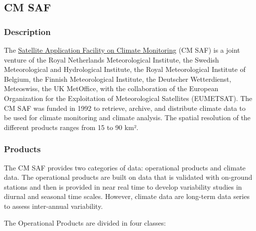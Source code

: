 \documentclass[11pt]{article}
\begin{document}
\subsection{CM SAF}
\label{sec-1-7}

\subsubsection{Description}
\label{sec-1-7-1}
The \href{http://www.cmsaf.eu/}{Satellite Application Facility on Climate Monitoring} (CM SAF)
is a joint venture of the Royal Netherlands Meteorological
Institute, the Swedish Meteorological and Hydrological Institute,
the Royal Meteorological Institute of Belgium, the Finnish
Meteorological Institute, the Deutscher Wetterdienst, Meteoswiss,
the UK MetOffice, with the collaboration of the European
Organization for the Exploitation of Meteorological Satellites
(EUMETSAT). The CM SAF was funded in 1992 to retrieve, archive,
and distribute climate data to be used for climate monitoring and
climate analysis. The spatial resolution of the different products
ranges from 15 to 90 km².
\subsubsection{Products}
\label{sec-1-7-2}
The CM SAF provides two categories of data: operational products
and climate data. The operational products are built on data that
is validated with on-ground stations and then is provided in near
real time to develop variability studies in diurnal and seasonal
time scales. However, climate data are long-term data series to
assess inter-annual variability.

The Operational Products are divided in four classes:
\end{document}
